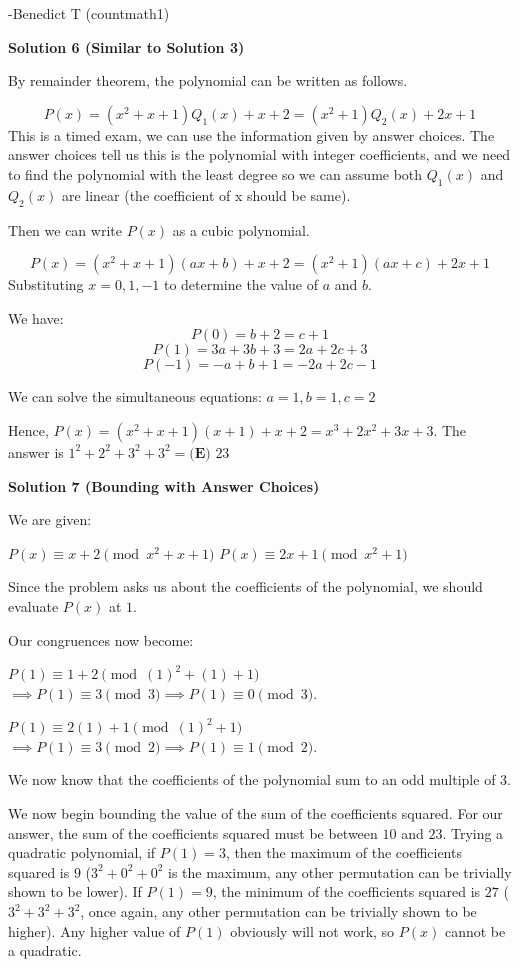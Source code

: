 \begin{enumerate}
 -Benedict T (countmath1)

 



\textbf{Solution 6 (Similar to Solution 3)}

By remainder theorem, the polynomial can be written as follows.

 
 \[P(x) = (x^2+x+1)Q_{1}(x)+x+2 = (x^2+1)Q_{2}(x)+2x+1\]This is a timed exam, we can use the information given by answer choices. The answer choices tell us this is the polynomial with integer coefficients, and we need to find the polynomial with the least degree so we can assume both $Q_{1}(x)$ and $Q_{2}(x)$ are linear (the coefficient of x should be same).

 Then we can write $P(x)$ as a cubic polynomial.

 
 \[P(x) = (x^2+x+1)(ax+b)+x+2 = (x^2+1)(ax+c)+2x+1\]Substituting $x=0,1,-1$ to determine the value of $a$ and $b$.

 We have:
 \[P(0) = b+2 = c+1\]
 \[P(1) = 3a+3b+3 = 2a+2c+3\]
 \[P(-1) = -a+b+1 = -2a+2c-1\]

 We can solve the simultaneous equations: $a=1,b=1,c=2$

 Hence, $P(x)=(x^2+x+1)(x+1)+x+2=x^3+2x^2+3x+3$. The answer is $1^2+2^2+3^2+3^2=\boxed{\textbf{(E) }23}$




\textbf{Solution 7 (Bounding with Answer Choices)}

We are given: 

 $P(x) \equiv x + 2 \pmod{x^2+x+1}$
$P(x) \equiv 2x + 1 \pmod{x^2+1}$

 Since the problem asks us about the coefficients of the polynomial, we should evaluate $P(x)$ at $1$.

 Our congruences now become:

 $P(1) \equiv 1 + 2 \pmod{(1)^2+(1)+1}$ $\implies P(1) \equiv 3 \pmod{3} \implies P(1) \equiv 0 \pmod{3}$.

 $P(1) \equiv 2(1) + 1 \pmod{(1)^2+1}$ $\implies P(1) \equiv 3 \pmod{2} \implies P(1) \equiv 1 \pmod{2}$.

 We now know that the coefficients of the polynomial sum to an odd multiple of 3. 

 We now begin bounding the value of the sum of the coefficients squared. For our answer, the sum of the coefficients squared must be between $10$ and $23$. Trying a quadratic polynomial, if $P(1) = 3$, then the maximum of the coefficients squared is $9$ ($3^2+0^2+0^2$ is the maximum, any other permutation can be trivially shown to be lower). If $P(1) = 9$, the minimum of the coefficients squared is $27$ ($3^2+3^2+3^2$, once again, any other permutation can be trivially shown to be higher). Any higher value of $P(1)$ obviously will not work, so $P(x)$ cannot be a quadratic.


\end{enumerate}
